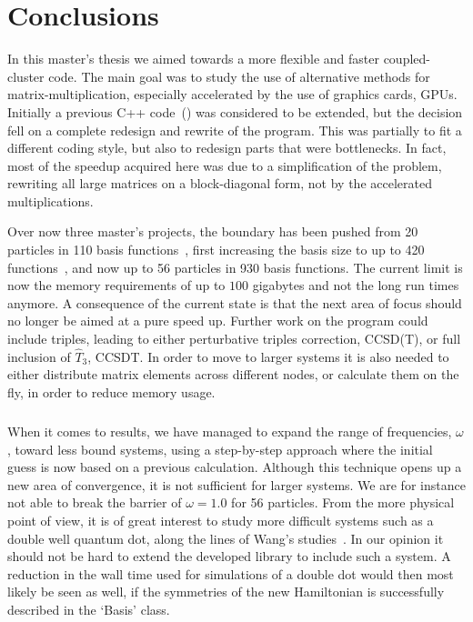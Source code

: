 \chapter{Conclusions}
In this master's thesis we aimed towards a more flexible and faster coupled-cluster code.
The main goal was to study the use of alternative methods for matrix-multiplication, especially accelerated by the use of graphics cards, GPUs.
Initially a previous C++ code~(\cite{marte,ymwang}) was considered to be extended, but the decision fell on a complete redesign and rewrite of the program.
This was partially to fit a different coding style, but also to redesign parts that were bottlenecks.
In fact, most of the speedup acquired here was due to a simplification of the problem, rewriting all large matrices on a block-diagonal form, not by the accelerated multiplications.

Over now three master's projects, the boundary has been pushed from 20 particles in 110 basis functions~\cite{mplohne}, first increasing the basis size to up to 420 functions~\cite{marte}, and now up to 56 particles in 930 basis functions.
The current limit is now the memory requirements of up to $100$ gigabytes and not the long run times anymore.
A consequence of the current state is that the next area of focus should no longer be aimed at a pure speed up.
Further work on the program could include triples, leading to either perturbative triples correction, CCSD(T), or full inclusion of $\hat{T}_3$, CCSDT.
In order to move to larger systems it is also needed to either distribute matrix elements across different nodes, or calculate them on the fly, in order to reduce memory usage.


\paragraph{}
When it comes to results, we have managed to expand the range of frequencies, $\omega$, toward less bound systems, using a step-by-step approach where the initial guess is now based on a previous calculation.
Although this technique opens up a new area of convergence, it is not sufficient for larger systems.
We are for instance not able to break the barrier of $\omega = 1.0$ for 56 particles.
From the more physical point of view, it is of great interest to study more difficult systems such as a double well quantum dot, along the lines of Wang's studies~\cite{ymwang}.
In our opinion it should not be hard to extend the developed library to include such a system.
A reduction in the wall time used for simulations of a double dot would then most likely be seen as well, if the symmetries of the new Hamiltonian is successfully described in the `Basis' class.

